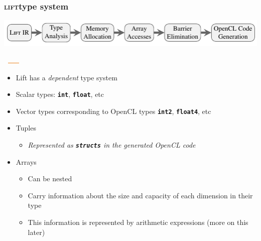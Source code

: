 \documentclass[10pt]{beamer}
\newcommand{\lift}{\textsc{lift}\space}
\newcommand{\code}[1]{\textbf{\texttt{#1}}}
\begin{document}
\begin{frame}[t]
\frametitle{\lift type system}
    \vspace{-1cm}
    \begin{block}{}
        \begin{center}
            \includegraphics[width=1\textwidth]{../images/compilation_stages.pdf}
        \end{center}
        \vspace{-1.05cm}
        \hspace{1.63cm}
        \includegraphics[width=1cm, height=0.03cm]{../images/orange_bar.png}
        \vspace{.45cm}
    \end{block}
    \vspace{-0.5cm}
\begin{itemize}
	\item Lift has a \textit{dependent} type system
	\item Scalar types: \code{int}, \code{float}, etc
	\item Vector types corresponding to OpenCL types \code{int2}, \code{float4}, etc
	\item Tuples
	\begin{itemize}
		\item \textit{Represented as \code{structs} in the generated OpenCL code}
	\end{itemize}
	\item Arrays
	\begin{itemize}
		\item Can be nested
		\item Carry information about the size and capacity of each dimension in their type
		\item This information is represented by arithmetic expressions (more on this later)
	\end{itemize}
\end{itemize}
\end{frame}
\end{document}
